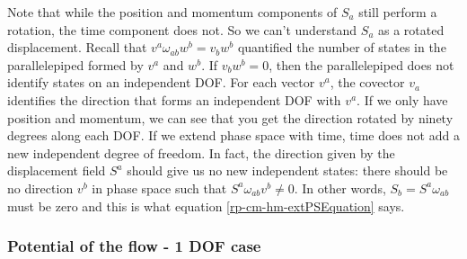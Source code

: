 Note that while the position and momentum components of $S_a$ still perform a rotation, the time component does not. So we can't understand $S_a$ as a rotated displacement. Recall that $v^a \omega_{ab} w^b = v_b w^b$ quantified the number of states in the parallelepiped formed by $v^a$ and $w^b$. If $v_b w^b = 0$, then the parallelepiped does not identify states on an independent DOF. For each vector $v^a$, the covector $v_a$ identifies the direction that forms an independent DOF with $v^a$. If we only have position and momentum, we can see that you get the direction rotated by ninety degrees along each DOF. If we extend phase space with time, time does not add a new independent degree of freedom. In fact, the direction given by the displacement field $S^a$ should give us no new independent states: there should be no direction $v^b$ in phase space such that $S^a \omega_{ab} v^b \neq 0$. In other words, $S_b = S^a \omega_{ab}$ must be zero and this is what equation \ref{rp-cm-hm-extPSEquation} says.

\subsubsection{Potential of the flow - 1 DOF case}

